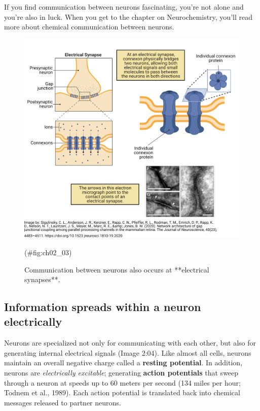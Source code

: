 \documentclass[
]{book}
\begin{document}
If you find communication between neurons fascinating, you're not alone and you're also in luck. When you get to the chapter on Neurochemistry, you'll read more about chemical communication between neurons.

\begin{figure}

{\centering \includegraphics[width=0.8\linewidth]{images/ch02/02_03} 

}

\caption{Communication between neurons also occurs at **electrical synapses**.}(\#fig:ch02_03)
\end{figure}

\hypertarget{information-spreads-within-a-neuron-electrically}{%
\subsection{Information spreads within a neuron electrically}\label{information-spreads-within-a-neuron-electrically}}

Neurons are specialized not only for communicating with each other, but also for generating internal electrical signals (Image 2:04). Like almost all cells, neurons maintain an overall negative charge called a \textbf{resting potential}. In addition, neurons are \emph{electrically excitable}; generating \textbf{action potentials} that sweep through a neuron at speeds up to 60 meters per second (134 miles per hour; Todnem et al., 1989). Each action potential is translated back into chemical messages released to partner neurons.
\end{document}
